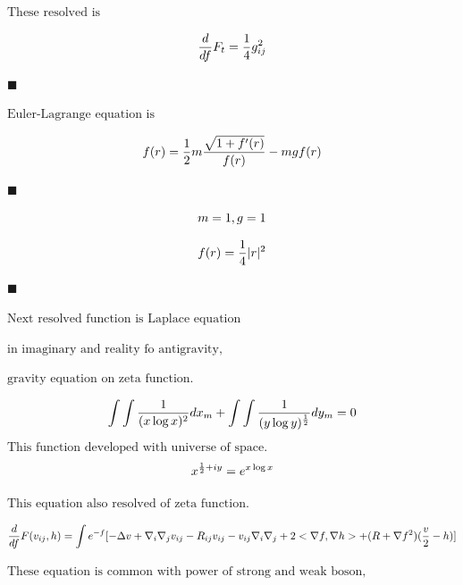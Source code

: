 \documentclass{jsarticle}
\begin{document}
$\text{These resolved is}$


\begin{equation}
   {d \over df}F_{t} = {1 \over 4}g^2_{ij}
\end{equation}
\begin{flushright}
$\blacksquare$
\end{flushright}

$\text{Euler-Lagrange equation is}$


\begin{equation}
   f(r) = {1 \over 2}m{\sqrt{1 + f'(r)} \over f(r)} - mgf(r)
\end{equation}
\begin{flushright}
$\blacksquare$
\end{flushright}

\begin{equation}
		m = 1, g = 1  \notag
\end{equation}

\begin{equation}
   f(r) = {1 \over 4}|r|^2
\end{equation}
\begin{flushright}
$\blacksquare$
\end{flushright}


$\text{Next resolved function is Laplace equation}$


$\text{in imaginary and reality fo antigravity,}$


$\text{gravity equation on zeta function.}$



\begin{equation}
 \int \int {1 \over (x \log x)^2}dx_{m} + \int \int {1 \over (y \log y)^{1 \over 2}}dy_{m} = 0  
\end{equation}
$\text{This function developed with universe of space.}$
\begin{equation}
   x^{{1 \over 2} + iy} = e^{x \log x} 
\end{equation}

  
$\text{This equation also resolved of zeta function.}$
 
\begin{equation}
   {d \over df} F(v_{ij},h) = \int e^{-f} [- \Delta v + \nabla_{i} \nabla_{j} v_{ij} - R_{ij} v_{ij} 
  - v_{ij} \nabla_{i} \nabla_{j} + 2 < \nabla f, \nabla h> + (R + \nabla f^2)({v \over 2} - h)]  
\end{equation}


$\text{These equation is common with power of strong and weak boson,}$
\end{document}
